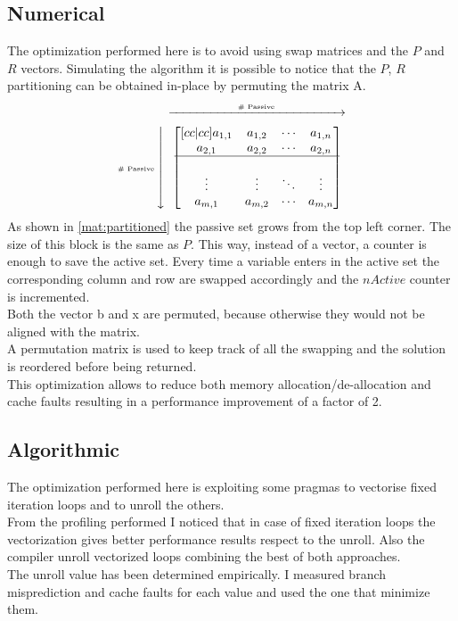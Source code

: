 \subsection{Numerical}
The optimization performed here is to avoid using swap matrices and the $P$ and $R$ vectors. Simulating the algorithm it is possible to notice that the $P$, $R$ partitioning can be obtained in-place by permuting the matrix A.
\begin{equation}
  \label{mat:partitioned}
  \text{\tiny \# Passive}\mymatrix{\begin{bmatrix}[cc|cc]
    a_{1,1} & a_{1,2} & \cdots & a_{1,n} \\
    a_{2,1} & a_{2,2} & \cdots & a_{2,n} \\
    \hline \\
    \vdots  & \vdots  & \ddots & \vdots  \\
    a_{m,1} & a_{m,2} & \cdots & a_{m,n}
  \end{bmatrix}}
\end{equation}
As shown in \ref{mat:partitioned} the passive set grows from the top left corner. The size of this block is the same as $P$. This way, instead of a vector, a counter is enough to save the active set. Every time a variable enters in the active set the corresponding column and row are swapped accordingly and the $nActive$ counter is incremented. \\
Both the vector b and x are permuted, because otherwise they would not be aligned with the matrix. \\
A permutation matrix is used to keep track of all the swapping and the solution is reordered before being returned. \\
This optimization allows to reduce both memory allocation/de-allocation and cache faults resulting in a performance improvement of a factor of 2.
\subsection{Algorithmic}
The optimization performed here is exploiting some pragmas to vectorise fixed iteration loops and to unroll the others. \\
From the profiling performed I noticed that in case of fixed iteration loops the vectorization gives better performance results respect to the unroll. Also the compiler unroll vectorized loops combining the best of both approaches. \\
The unroll value has been determined empirically. I measured branch misprediction and cache faults for each value and used the one that minimize them.\\